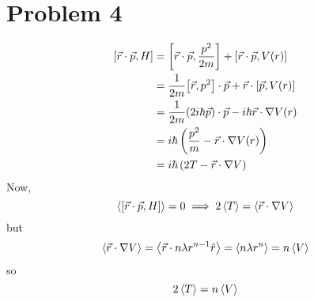 \documentclass[12pt]{article}
\begin{document}
\section*{Problem 4}
\begin{align*}
    \comm{\vec{r}\cdot\vec{p}}{H} &= \comm{\vec{r}\cdot\vec{p}}{\frac{p^2}{2m}} + \comm{\vec{r}\cdot\vec{p}}{V(r)} \\
    &= \frac{1}{2m}\comm{\vec{r}}{p^2}\cdot\vec{p} + \vec{r}\cdot\comm{\vec{p}}{V(r)} \\
    &= \frac{1}{2m}(2i\hbar\vec{p})\cdot{\vec{p}} - i\hbar\vec{r}\cdot\nabla V(r) \\
    &= i\hbar\left(\frac{p^2}{m} - \vec{r}\cdot\nabla V(r)\right) \\
    &= i\hbar\left(2T - \vec{r}\cdot\nabla V\right)
\end{align*}
Now,
\[ \ev{\comm{\vec{r}\cdot\vec{p}}{H}} = 0 \implies 2\ev{T} = \ev{\vec{r}\cdot\nabla V} \]
but 
\[ \ev{\vec{r}\cdot\nabla V} = \ev{\vec{r} \cdot n\lambda r^{n-1}\hat{r}} = \ev{n\lambda r^n} = n\ev{V} \]
so
\[ 2\ev{T} = n\ev{V} \]
\end{document}
